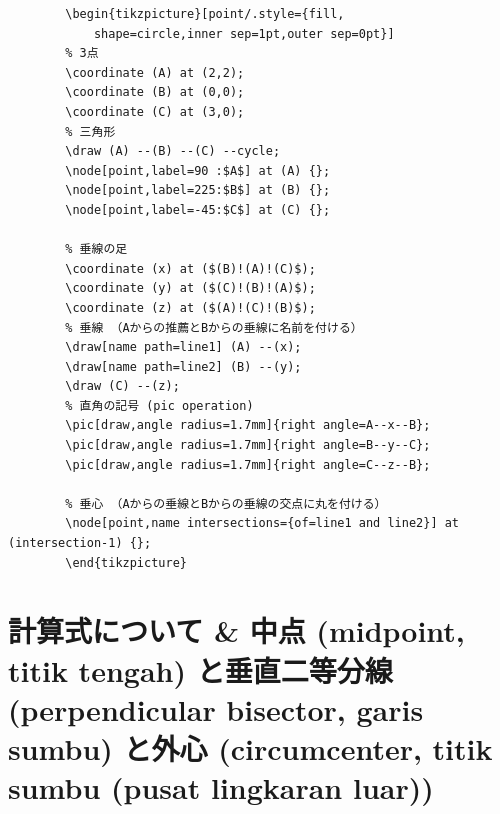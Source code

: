 \documentclass[lualatex]{jlreq}
\begin{document}
\begin{lstlisting}[language={[LaTeX] TeX},numbers=none,breaklines=false,gobble=8]
        % この例では \usetikzlibrary{angles} も必要
        \begin{tikzpicture}[point/.style={fill,
            shape=circle,inner sep=1pt,outer sep=0pt}]
        % 3点
        \coordinate (A) at (2,2);
        \coordinate (B) at (0,0);
        \coordinate (C) at (3,0);
        % 三角形
        \draw (A) --(B) --(C) --cycle;
        \node[point,label=90 :$A$] at (A) {};
        \node[point,label=225:$B$] at (B) {};
        \node[point,label=-45:$C$] at (C) {};

        % 垂線の足
        \coordinate (x) at ($(B)!(A)!(C)$);
        \coordinate (y) at ($(C)!(B)!(A)$);
        \coordinate (z) at ($(A)!(C)!(B)$);
        % 垂線 （Aからの推薦とBからの垂線に名前を付ける）
        \draw[name path=line1] (A) --(x);
        \draw[name path=line2] (B) --(y);
        \draw (C) --(z);
        % 直角の記号 (pic operation)
        \pic[draw,angle radius=1.7mm]{right angle=A--x--B};
        \pic[draw,angle radius=1.7mm]{right angle=B--y--C};
        \pic[draw,angle radius=1.7mm]{right angle=C--z--B};

        % 垂心 （Aからの垂線とBからの垂線の交点に丸を付ける）
        \node[point,name intersections={of=line1 and line2}] at (intersection-1) {};
        \end{tikzpicture}
\end{lstlisting}

\section{計算式について \& 中点 (midpoint, titik tengah) と垂直二等分線 (perpendicular bisector, garis sumbu) と外心 (circumcenter, titik sumbu (pusat lingkaran luar))}
\end{document}
